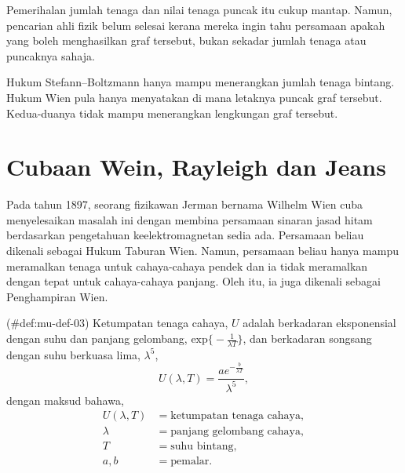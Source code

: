 \documentclass[
]{book}
\begin{document}
Pemerihalan jumlah tenaga dan nilai tenaga puncak itu cukup mantap.
Namun, pencarian ahli fizik belum selesai kerana mereka ingin tahu
persamaan apakah yang boleh menghasilkan graf tersebut, bukan sekadar
jumlah tenaga atau puncaknya sahaja.

Hukum Stefann--Boltzmann hanya mampu menerangkan jumlah tenaga bintang.
Hukum Wien pula hanya menyatakan di mana letaknya puncak graf tersebut.
Kedua-duanya tidak mampu menerangkan lengkungan graf tersebut.

\hypertarget{sec:wien-rayleigh-jeans}{%
\section{Cubaan Wein, Rayleigh dan
Jeans}\label{sec:wien-rayleigh-jeans}}

Pada tahun 1897, seorang fizikawan Jerman bernama Wilhelm Wien cuba
menyelesaikan masalah ini dengan membina persamaan sinaran jasad hitam
berdasarkan pengetahuan keelektromagnetan sedia ada. Persamaan beliau
dikenali sebagai Hukum Taburan Wien. Namun, persamaan beliau hanya mampu
meramalkan tenaga untuk cahaya-cahaya pendek dan ia tidak meramalkan
dengan tepat untuk cahaya-cahaya panjang. Oleh itu, ia juga dikenali
sebagai Penghampiran Wien.

\BeginKnitrBlock{definition}{}

\protect\hypertarget{def:mu-def-03}{}{(\#def:mu-def-03) {} }Ketumpatan tenaga cahaya, \(U\)
adalah berkadaran eksponensial dengan suhu dan panjang gelombang,
\(\text{exp}\Big\{-\frac{1}{\lambda T}\Big\}\), dan berkadaran songsang
dengan suhu berkuasa lima, \(\lambda^5\), \begin{equation}
U(\lambda,T) = \frac{ae^{-\frac{b}{\lambda T}}}{\lambda^5},
\end{equation} dengan maksud bahawa, \begin{equation*}
\begin{split}
U(\lambda,T) & = \text{ketumpatan tenaga cahaya},\\
\lambda & = \text{panjang gelombang cahaya},\\
T & = \text{suhu bintang},\\
a,b & = \text{pemalar}.\\
\end{split}
\end{equation*} 
\end{document}
